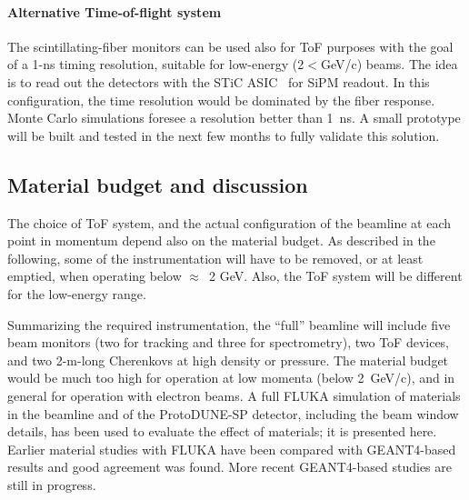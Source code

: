 \paragraph{Alternative Time-of-flight system}
The  scintillating-fiber monitors can be used also for ToF purposes with the goal of a 1-ns timing resolution, suitable for low-energy (2$<$GeV/c) beams. 
The idea is to read out the detectors with the STiC ASIC~\cite{STIC} for SiPM readout. 
In this configuration, the time resolution would be dominated by the fiber response. Monte Carlo simulations foresee 
  a resolution better than 1~ns. 
A small prototype will be built and tested in the next few months to fully validate this solution.

\subsection{Material budget and discussion}
\label{beam-material-budget}

The choice of ToF system, and the actual configuration of the beamline at each point in momentum depend also on the material budget. 
As described in the following, some of the instrumentation will have to be removed, or at least emptied, when operating below $\approx$~2 GeV. Also, the ToF system will be different for the low-energy range.

Summarizing %
the required instrumentation, the ``full'' beamline will  include
 five beam monitors (two for tracking and three for spectrometry), two ToF devices, and two 2-m-long Cherenkovs at high density or pressure. The material budget would be much too high for operation at low momenta (below 2~GeV/c),  and in general for operation with electron beams.  
A full FLUKA\cite{fluka05,Fluka15}  simulation of materials in the beamline and of the ProtoDUNE-SP detector, including the beam window details, has been used to evaluate the effect of materials; it is presented here. 
Earlier material studies with FLUKA have been compared with GEANT4-based results and good agreement was found. More recent GEANT4-based studies are still in progress.

